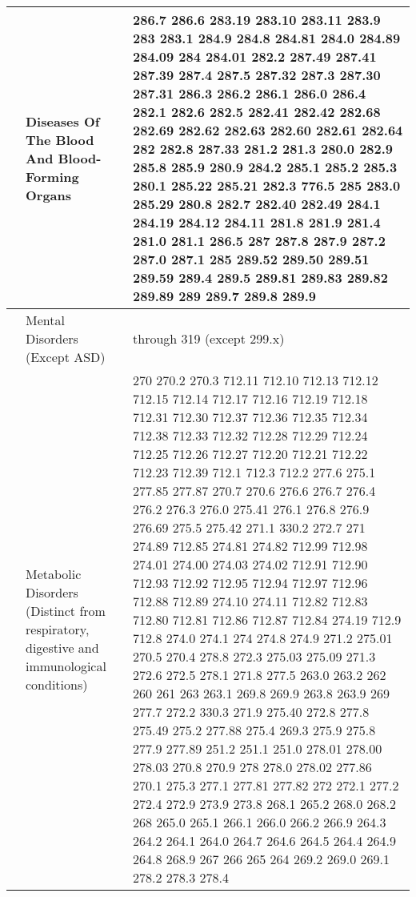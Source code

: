 \begin{longtable}{|L{.1in}|L{.6in}||L{5.65in}|}
   &  Diseases Of The Blood And Blood-Forming Organs &  286.7 286.6 283.19 283.10 283.11 283.9 283 283.1 284.9 284.8 284.81 284.0 284.89 284.09 284 284.01 282.2 287.49 287.41 287.39 287.4 287.5 287.32 287.3 287.30 287.31 286.3 286.2 286.1 286.0 286.4 282.1 282.6 282.5 282.41 282.42 282.68 282.69 282.62 282.63 282.60 282.61 282.64 282 282.8 287.33 281.2 281.3 280.0 282.9 285.8 285.9 280.9 284.2 285.1 285.2 285.3 280.1 285.22 285.21 282.3 776.5 285 283.0 285.29 280.8 282.7 282.40 282.49 284.1 284.19 284.12 284.11 281.8 281.9 281.4 281.0 281.1 286.5 287 287.8 287.9 287.2 287.0 287.1 285 289.52 289.50 289.51 289.59 289.4 289.5 289.81 289.83 289.82 289.89 289 289.7 289.8 289.9
  \\\hline
   & Mental Disorders (Except ASD) &  through 319 (except 299.x) \\\hline
   & Metabolic Disorders (Distinct from respiratory, digestive and immunological conditions) &  270 270.2 270.3 712.11 712.10 712.13 712.12 712.15 712.14 712.17 712.16 712.19 712.18 712.31 712.30 712.37 712.36 712.35 712.34 712.38 712.33 712.32 712.28 712.29 712.24 712.25 712.26 712.27 712.20 712.21 712.22 712.23 712.39 712.1 712.3 712.2 277.6 275.1 277.85 277.87 270.7 270.6 276.6 276.7 276.4 276.2 276.3 276.0 275.41 276.1 276.8 276.9 276.69 275.5 275.42 271.1 330.2 272.7 271 274.89 712.85 274.81 274.82 712.99 712.98 274.01 274.00 274.03 274.02 712.91 712.90 712.93 712.92 712.95 712.94 712.97 712.96 712.88 712.89 274.10 274.11 712.82 712.83 712.80 712.81 712.86 712.87 712.84 274.19 712.9 712.8 274.0 274.1 274 274.8 274.9 271.2 275.01 270.5 270.4 278.8 272.3 275.03 275.09 271.3 272.6 272.5 278.1 271.8 277.5 263.0 263.2 262 260 261 263 263.1 269.8 269.9 263.8 263.9 269 277.7 272.2 330.3 271.9 275.40 272.8 277.8 275.49 275.2 277.88 275.4 269.3 275.9 275.8 277.9 277.89 251.2 251.1 251.0 278.01 278.00 278.03 270.8 270.9 278 278.0 278.02 277.86 270.1 275.3 277.1 277.81 277.82 272 272.1 277.2 272.4 272.9 273.9 273.8 268.1 265.2 268.0 268.2 268 265.0 265.1 266.1 266.0 266.2 266.9 264.3 264.2 264.1 264.0 264.7 264.6 264.5 264.4 264.9 264.8 268.9 267 266 265 264 269.2 269.0 269.1 278.2 278.3 278.4\\\hline

\end{longtable}
